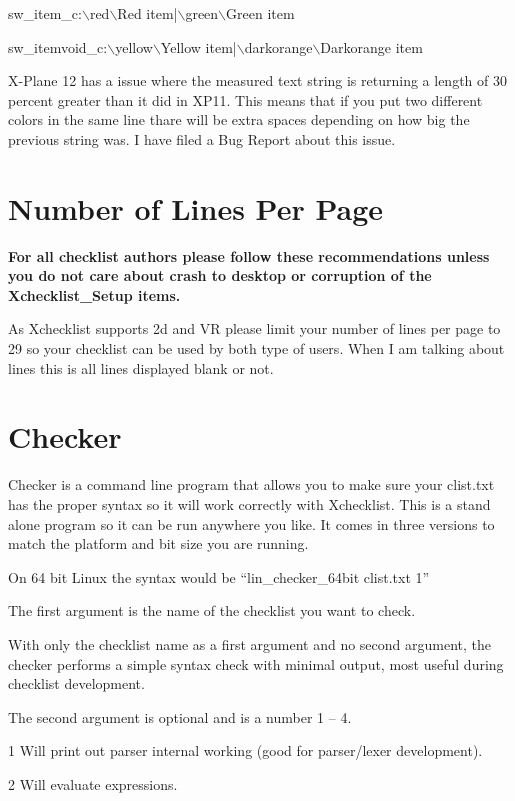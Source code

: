 \documentclass[11pt,parskip=half,a4paper]{scrartcl}
\begin{document}
sw\_item\_c:$\backslash$red$\backslash$Red item|$\backslash$green$\backslash$Green item

sw\_itemvoid\_c:$\backslash$yellow$\backslash$Yellow item|$\backslash$darkorange$\backslash$Darkorange item

X-Plane 12 has a issue where the measured text string is returning a length of 30 percent greater than it did in XP11. This means that if you put two different colors in the same line thare will be extra spaces depending on how big the previous string was. I have filed a Bug Report about this issue.


\newpage
\section{Number of Lines Per Page}


\textbf{For all checklist authors please follow these recommendations unless you do not care about crash to desktop or corruption of the Xchecklist\_Setup items.}

As Xchecklist supports 2d and VR please limit your number of lines per page to 29 so your checklist can be used by both type of users. When I am talking about lines this is all lines displayed blank or not.

\newpage
\section{Checker}


Checker is a command line program that allows you to make sure your clist.txt has the proper syntax so it will work correctly with Xchecklist. This is a stand alone program so it can be run anywhere you like. It comes in three versions to match the platform and bit size you are running.

On 64 bit Linux the syntax would be ``lin\_checker\_64bit clist.txt 1''

The first argument is the name of the checklist you want to check.

With only the checklist name as a first argument and no second argument, the checker performs a simple syntax check with minimal output, most useful during checklist development.

The second argument is optional and is a number 1 -- 4.

1 Will print out parser internal working (good for parser/lexer development).

2 Will evaluate expressions.
\end{document}
